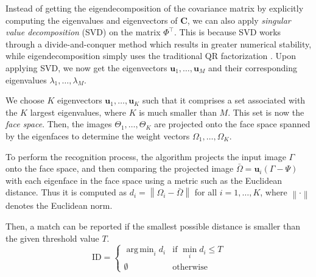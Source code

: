 Instead of getting the eigendecomposition of the covariance matrix by explicitly computing the eigenvalues and eigenvectors of $\mathbf{C}$, we can also apply \textit{singular value decomposition} (SVD) on the matrix $\Phi^\top$. This is because SVD works through a divide-and-conquer method which results in greater numerical stability, while eigendecomposition simply uses the traditional QR factorization \cite{nakatsukasa_stable_2013, gu_divide-and-conquer_1995}. Upon applying SVD, we now get the eigenvectors $\mathbf{u}_1, \ldots, \mathbf{u}_M$ and their corresponding eigenvalues $\lambda_1, \ldots, \lambda_M$.

We choose $K$ eigenvectors $\mathbf{u}_1, \ldots, \mathbf{u}_K$ such that it comprises a set associated with the $K$ largest eigenvalues, where $K$ is much smaller than $M$. This set is now the \textit{face space}. Then, the images $\Theta_1, \ldots, \Theta_K$ are projected onto the face space spanned by the eigenfaces to determine the weight vectors $\Omega_1, \ldots, \Omega_K$.

To perform the recognition process, the algorithm projects the input image $\Gamma$ onto the face space, and then comparing the projected image $\bar{\Omega} = \mathbf{u}_i\left(\Gamma - \Psi\right)$ with each eigenface in the face space using a metric such as the Euclidean distance. Thus it is computed as $d_i = \left\lVert \Omega_i -\bar{\Omega} \right\rVert$ for all $i=1,\ldots,K$, where $\left\lVert \cdot \right\rVert$ denotes the Euclidean norm.

Then, a match can be reported if the smallest possible distance is smaller than the given threshold value $T$. 
\newcommand{\argmin}{\mathop{\mathrm{arg\,min}}}  
\[\text{ID} = \begin{cases}\argmin_i d_i & \text{if } \min_i d_i \le T \\\emptyset & \text {otherwise}\end{cases}
\]



